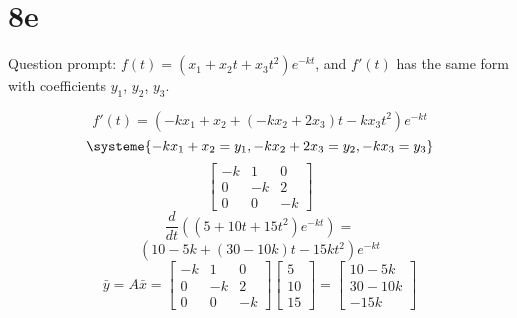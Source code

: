 \documentclass[12pt]{article}
\begin{document}
\section{8e}

Question prompt: $f(t) = (x_1 + x_2t + x_3t^2)e^{-kt}$, and $f'(t)$ has the same
form with coefficients $y_1$, $y_2$, $y_3$.

\[
  f'(t) = (-kx_1 + x_2 + (-kx_2+2x_3)t - kx_3t^2)e^{-kt}
\]
\[
  \systeme{-kx_1 + x_2 = y_1, -kx_2+2x_3 = y_2, -kx_{3} = y_3}
\]
\[
  \begin{bmatrix}
    -k & 1 & 0 \\
    0 & -k & 2 \\
    0 & 0 & -k
  \end{bmatrix}
\]
\[
  \frac{d}{dt}((5+10t+15t^2)e^{-kt}) = 
\]
\[
  (10-5k + (30-10k)t -15kt^2)e^{-kt}
\]
\medbreak{}
\[
  \bar{y} = A\bar{x} = 
  \begin{bmatrix}
    -k & 1 & 0 \\
    0 & -k & 2 \\
    0 & 0 & -k
  \end{bmatrix}
  \begin{bmatrix} 5 \\ 10 \\ 15 \end{bmatrix} = 
  \begin{bmatrix} 10-5k \\ 30-10k \\ -15k \end{bmatrix}
\]
\end{document}
